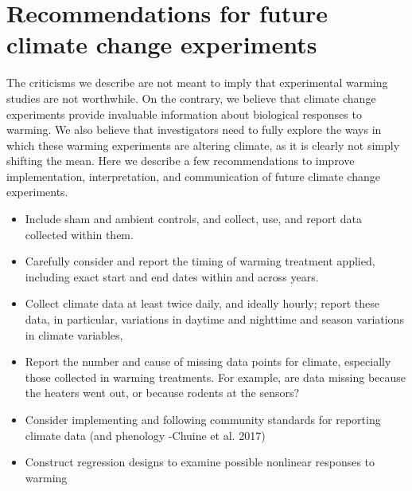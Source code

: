 \documentclass{article}
\begin{document}
\section{Recommendations for future climate change experiments}
The criticisms we describe are not meant to imply that experimental warming studies are not worthwhile. On the contrary, we believe that climate change experiments provide invaluable information about biological responses to warming. We also believe that investigators need to fully explore the ways in which these warming experiments are altering climate, as it is clearly not simply shifting the mean. Here we describe a few recommendations to improve implementation, interpretation, and communication of future climate change experiments.
\begin{itemize}
\item Include sham and ambient controls, and collect, use, and report data collected within them. 
\item Carefully consider and report the timing of warming treatment applied, including exact start and end dates within and across years. 
\item Collect climate data at least twice daily, and ideally hourly; report these data, in particular, variations in daytime and nighttime and season variations in climate variables,
\item Report the number and cause of missing data points for climate, especially those collected in warming treatments. For example, are data missing because the heaters went out, or because rodents at the sensors?
\item Consider implementing and following community standards for reporting climate data (and phenology -Chuine et al. 2017)
\item Construct regression designs to examine possible nonlinear responses to warming

\end{itemize}
\end{document}
